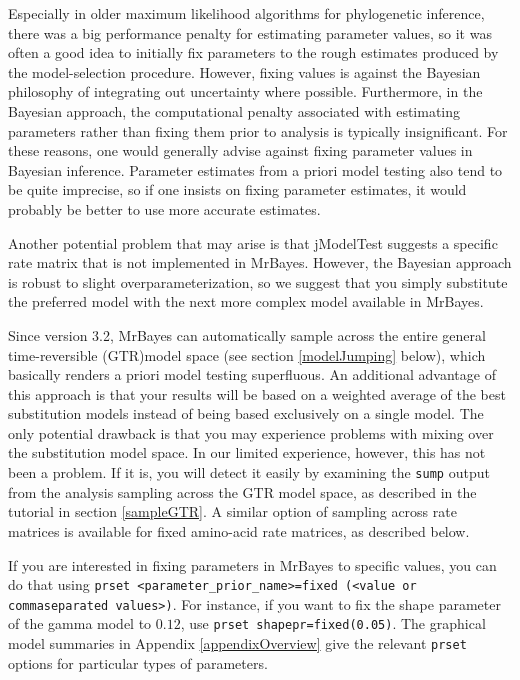 \documentclass[12pt]{book}
\begin{document}
Especially in older maximum likelihood algorithms for phylogenetic inference, there was a big
performance penalty for estimating parameter values, so it was often a good idea to initially fix
parameters to the rough estimates produced by the model-selection procedure. However, fixing values
is against the Bayesian philosophy of integrating out uncertainty where possible. Furthermore, in
the Bayesian approach, the computational penalty associated with estimating parameters rather than
fixing them prior to analysis is typically insignificant. For these reasons, one would generally
advise against fixing parameter values in Bayesian inference. Parameter estimates from a priori
model testing also tend to be quite imprecise, so if one insists on fixing parameter estimates, it
would probably be better to use more accurate estimates.

Another potential problem that may arise is that jModelTest suggests a specific rate matrix that is
not implemented in MrBayes. However, the Bayesian approach is robust to slight
overparameterization, so we suggest that you simply substitute the preferred model with the next
more complex model available in MrBayes.

Since version 3.2, MrBayes can automatically sample across the entire general time-reversible
(GTR)model space (see section \ref{modelJumping} below), which basically renders a priori model
testing superfluous. An additional advantage of this approach is that your results will be based on
a weighted average of the best substitution models instead of being based exclusively on a single
model. The only potential drawback is that you may experience problems with mixing over the
substitution model space. In our limited experience, however, this has not been a problem. If it
is, you will detect it easily by examining the \texttt{sump} output from the analysis sampling
across the GTR model space, as described in the tutorial in section \ref{sampleGTR}. A similar
option of sampling across rate matrices is available for fixed amino-acid rate matrices, as
described below.

If you are interested in fixing parameters in MrBayes to specific values, you can do that using
\texttt{prset <parameter\_prior\_name>=fixed (<value or commaseparated values>)}. For instance, if
you want to fix the shape parameter of the gamma model to $0.12$, use \texttt{prset
shapepr=fixed(0.05)}. The graphical model summaries in Appendix \ref{appendixOverview} give the
relevant \texttt{prset} options for particular types of parameters.
\end{document}
